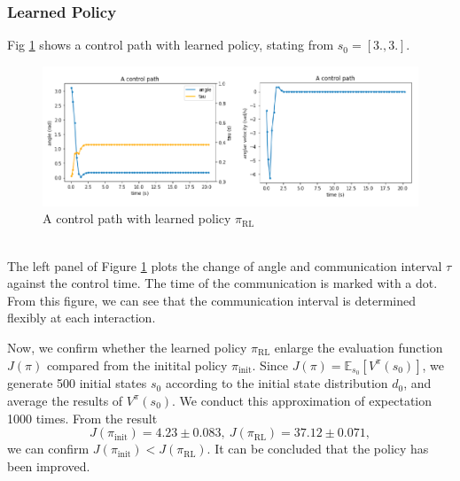 \documentclass[english, dvipdfmx]{ampmt}             %
\newcommand{\expect}{\mathbb{E}}
\begin{document}
\subsubsection{Learned Policy}
Fig \ref{control_path} shows a control path with learned policy, stating from $s_0 = [3., 3.]$.
\begin{figure}[h]
	\centering
 	\includegraphics[width=12cm]{control_path.png}
 	\caption{A control path with learned policy $\pi_{\textrm{RL}}$} \label{control_path}
\end{figure}\\
The left panel of Figure \ref{control_path} plots the change of angle and communication interval $\tau$ against the control time. The time of the communication is marked with a dot. From this figure, we can see that the communication interval is determined flexibly at each interaction.\par
Now, we confirm whether the learned policy $\pi_{\textrm{RL}}$ enlarge the evaluation function $J(\pi)$ compared from the initital policy $\pi_{\textrm{init}}$. Since $J(\pi) = \expect_{s_0}[V^{\pi}(s_0)]$, we generate 500 initial states $s_0$ according to the initial state distribution $d_0$, and average the results of $V^{\pi}(s_0)$. We conduct this approximation of expectation 1000 times. From the result
\begin{equation}
	J(\pi_{\textrm{init}}) = 4.23 \pm 0.083,~J(\pi_{\textrm{RL}}) = 37.12 \pm 0.071 \label{compare_policy}, 
\end{equation}
we can confirm $J(\pi_{\textrm{init}}) < J(\pi_{\textrm{RL}})$. It can be concluded that the policy has been improved.
\end{document}
